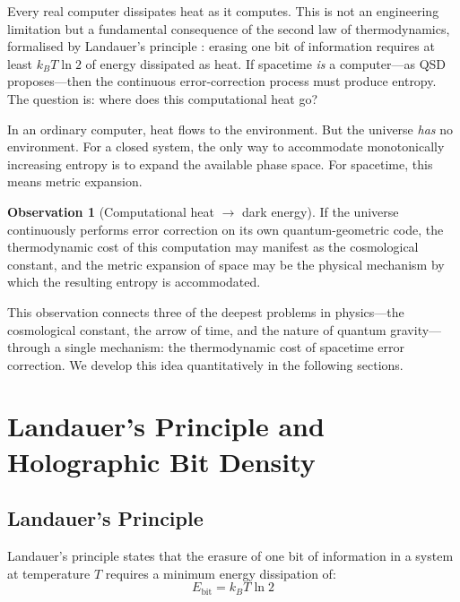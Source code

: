 \documentclass[11pt,a4paper]{article}
\theoremstyle{definition}
\newtheorem{observation}[theorem]{Observation}
\begin{document}
Every real computer dissipates heat as it computes. This is not an engineering limitation but a fundamental consequence of the second law of thermodynamics, formalised by Landauer's principle \cite{Landauer1961}: erasing one bit of information requires at least $k_B T \ln 2$ of energy dissipated as heat. If spacetime \emph{is} a computer---as QSD proposes---then the continuous error-correction process must produce entropy. The question is: where does this computational heat go?

In an ordinary computer, heat flows to the environment. But the universe \emph{has} no environment. For a closed system, the only way to accommodate monotonically increasing entropy is to expand the available phase space. For spacetime, this means metric expansion.

\begin{observation}[Computational heat $\to$ dark energy]
If the universe continuously performs error correction on its own quantum-geometric code, the thermodynamic cost of this computation may manifest as the cosmological constant, and the metric expansion of space may be the physical mechanism by which the resulting entropy is accommodated.
\end{observation}

This observation connects three of the deepest problems in physics---the cosmological constant, the arrow of time, and the nature of quantum gravity---through a single mechanism: the thermodynamic cost of spacetime error correction. We develop this idea quantitatively in the following sections.


\section{Landauer's Principle and Holographic Bit Density}

\subsection{Landauer's Principle}

Landauer's principle \cite{Landauer1961} states that the erasure of one bit of information in a system at temperature $T$ requires a minimum energy dissipation of:
\begin{equation}\label{eq:landauer}
    E_{\text{bit}} = k_B T \ln 2
\end{equation}
\end{document}
